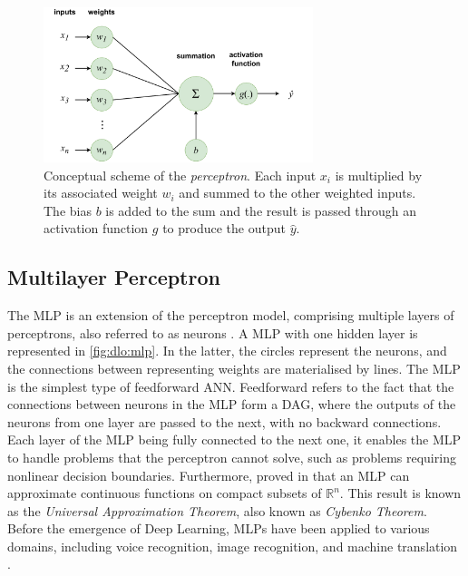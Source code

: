 \begin{figure}[htbp]
  \centering
  \includegraphics[width=0.7\textwidth]{chapter_dlo/assets/perceptron_scheme.pdf}
  \caption{Conceptual scheme of the \emph{perceptron}. Each input $x_i$ is multiplied
  by its associated weight $w_i$ and summed to the other weighted inputs. The
  bias $b$ is added to the sum and the result is passed through an activation
  function $g$ to produce the output $\hat{y}$.}
  \label{fig:dlo:perceptron}
\end{figure}

\subsection{Multilayer Perceptron}\label{sec:dlo:mlp}


The \acf{MLP} is an extension of the perceptron model, comprising multiple
layers of perceptrons, also referred to as neurons \cite{rumelhart1986learning}.
A \ac{MLP} with one hidden layer is represented in \cref{fig:dlo:mlp}. In the
latter, the circles represent the neurons, and the connections between
representing weights are materialised by lines. The \ac{MLP} is the simplest
type of feedforward \ac{ANN}. Feedforward refers to the fact that the
connections between neurons in the \ac{MLP} form a \acf{DAG}, where the outputs
of the neurons from one layer are passed to the next, with no backward
connections.\\

Each layer of the \ac{MLP} being fully connected to the next one, it enables the
\ac{MLP} to handle problems that the perceptron cannot solve, such as problems
requiring nonlinear decision boundaries. Furthermore,
\citeauthor{cybenko1989approximation} proved in \cite{cybenko1989approximation}
that an \ac{MLP} can approximate continuous functions on compact subsets of
$\mathbb{R}^n$. This result is known as the \emph{Universal Approximation
Theorem}, also known as \emph{Cybenko Theorem}. Before the emergence of Deep
Learning, \acp{MLP} have been applied to various domains, including voice
recognition, image recognition, and machine translation
\cite{wasserman1988neural}.


